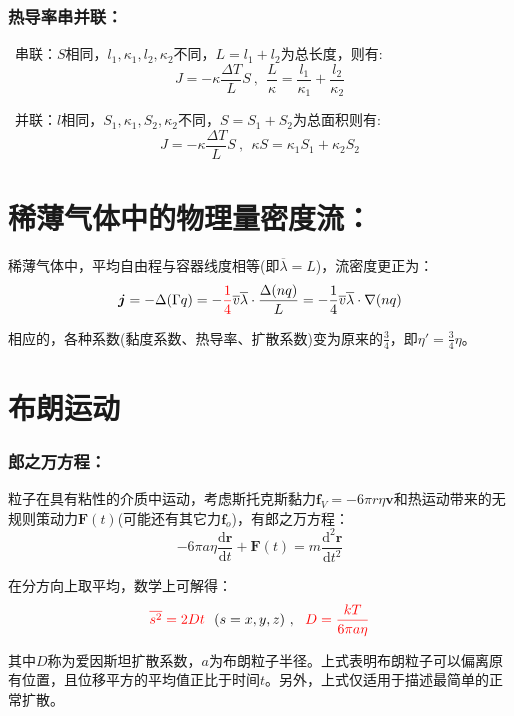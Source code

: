 \documentclass[zihao=-4,UTF8]{report}
\begin{document}
\subsubsection{热导率串并联：}
\ 串联：$S$相同，$l_1,\kappa_1,l_2,\kappa_2$不同，$L=l_1+l_2$为总长度，则有:
\begin{equation}
    J = -\kappa\frac{\Delta T}{L}S\ ,\ \ \frac{L}{\kappa} = \frac{l_1}{\kappa_1} +\frac{l_2}{\kappa_2}
\end{equation}\par
{}\ 并联：$l$相同，$S_1,\kappa_1,S_2,\kappa_2$不同，$S=S_1+S_2$为总面积则有:
\begin{equation}
    J = -\kappa\frac{\Delta T}{L}S\ ,\ \ \kappa S = \kappa_1 S_1 +\kappa_2 S_2
\end{equation}
\section{稀薄气体中的物理量密度流：}
稀薄气体中，平均自由程与容器线度相等(即$\overline{\lambda} = L$)，流密度更正为：
\begin{equation}
    \boldsymbol{j} = -\Delta (\Gamma q) =  - \textcolor{red}{\frac{1}{4} } \overline{v}\overline{\lambda} \cdot \frac{\Delta (nq)}{L} = - \frac{1}{4} \overline{v}\overline{\lambda} \cdot \nabla(nq)
\end{equation}\par
相应的，各种系数(黏度系数、热导率、扩散系数)变为原来的$\frac{3}{4}$，即$\eta' = \frac{3}{4}\eta$。
\section{布朗运动}
\subsubsection{郎之万方程：}
粒子在具有粘性的介质中运动，考虑斯托克斯黏力$\boldsymbol{f}_V = -6\pi r\eta\boldsymbol{v}$和热运动带来的无规则策动力$\boldsymbol{F}(t)$(可能还有其它力$\boldsymbol{f}_o$)，有郎之万方程：
\begin{equation}
    -6\pi a\eta\frac{\mathrm{d}\boldsymbol{r}}{\mathrm{d}t } + \boldsymbol{F}(t) = m\frac{\mathrm{d}^2\boldsymbol{r}}{\mathrm{d}t^2}
\end{equation}\par 
在分方向上取平均，数学上可解得：
\begin{equation}
    \textcolor{red}{\overline{s^2}  = 2Dt}\ \ (s = x,y,z)\ ,\ \  \textcolor{red}{D = \frac{kT}{6\pi a \eta }}
\end{equation}\par
{\color{gray}\small 其中$D$称为爱因斯坦扩散系数，$a$为布朗粒子半径。上式表明布朗粒子可以偏离原有位置，且位移平方的平均值正比于时间$t$。另外，上式仅适用于描述最简单的正常扩散。} 
\end{document}
